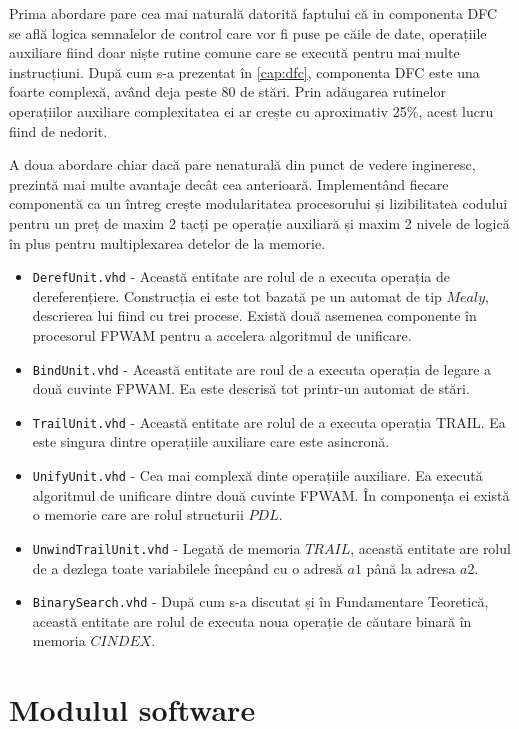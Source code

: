 \documentclass[12pt,a4paper,twoside]{report}
\begin{document}
Prima abordare pare cea mai naturală datorită faptului că in componenta DFC se află logica semnalelor de control care vor fi puse pe căile de date, operațiile auxiliare fiind doar niște rutine comune care se execută pentru mai multe instrucțiuni. După cum s-a prezentat în \ref{cap:dfc}, componenta DFC este una foarte complexă, având deja peste 80 de stări. Prin adăugarea rutinelor operațiilor auxiliare complexitatea ei ar crește cu aproximativ 25\%, acest lucru fiind de nedorit.

A doua abordare chiar dacă pare nenaturală din punct de vedere ingineresc, prezintă mai multe avantaje decât cea anterioară. Implementând fiecare componentă ca un întreg crește modularitatea procesorului și lizibilitatea codului pentru un preț de maxim 2 tacți pe operație auxiliară și maxim 2 nivele de logică în plus pentru multiplexarea detelor de la memorie.

\begin{itemize}
\item \texttt{DerefUnit.vhd} - Această entitate are rolul de a executa operația de dereferențiere. Construcția ei este tot bazată pe un automat de tip $Mealy$, descrierea lui fiind cu trei procese. Există două asemenea componente în procesorul FPWAM pentru a accelera algoritmul de unificare.
\item \texttt{BindUnit.vhd} - Această entitate are roul de a executa operația de legare a două cuvinte FPWAM. Ea este descrisă tot printr-un automat de stări.
\item \texttt{TrailUnit.vhd} - Această entitate are rolul de a executa operația TRAIL. Ea este singura dintre operațiile auxiliare care este asincronă.
\item \texttt{UnifyUnit.vhd} - Cea mai complexă dinte operațiile auxiliare. Ea execută algoritmul de unificare dintre două cuvinte FPWAM. În componența ei există o memorie care are rolul structurii $PDL$.
\item \texttt{UnwindTrailUnit.vhd} - Legată de memoria $TRAIL$, această entitate are rolul de a dezlega toate variabilele începând cu o adresă $a1$ până la adresa $a2$.
\item \texttt{BinarySearch.vhd} - După cum s-a discutat și în Fundamentare Teoretică, această entitate are rolul de executa noua operație de căutare binară în memoria $CINDEX$.
\end{itemize}

\section{Modulul software}
\end{document}
